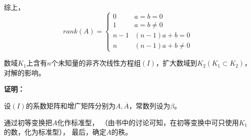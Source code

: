 \documentclass{article}
\begin{document}
综上，
\begin{equation*}
  rank(A) = \begin{cases}
    0     & a = b = 0           \\
    1     & a = b \neq 0        \\
    n - 1 & (n - 1)a + b = 0    \\
    n     & (n - 1)a + b \neq 0
  \end{cases}
\end{equation*}

\begin{zremark}
  数域$K_1$上含有$n$个未知量的非齐次线性方程组$(I)$，扩大数域到$K_2(K_1 \subset K_2)$，
  对解的影响。
\end{zremark}

\textbf{证明：}

设$(I)$的系数矩阵和增广矩阵分别为$A, \overline{A}$，常数列设为$\beta$。

通过初等变换把$A$化作标准型，
（由书中的讨论可知，在初等变换中可只使用$K_1$的数，化为标准型），
最后，确定$A$的秩。
\end{document}
